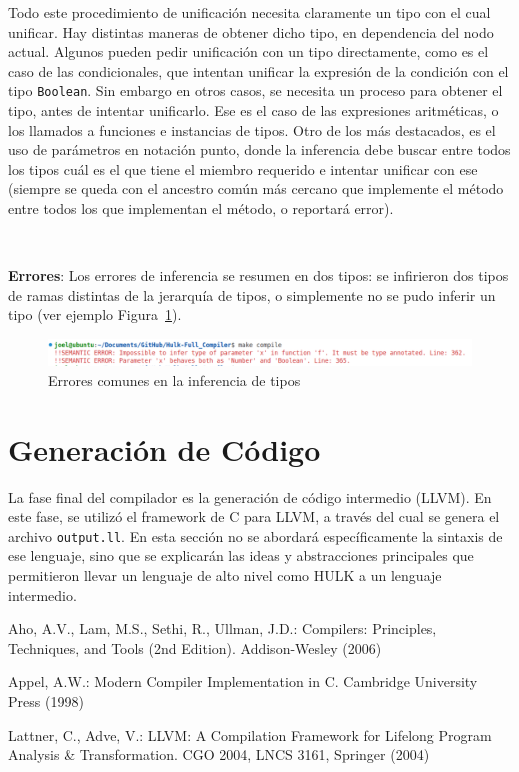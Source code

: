 \documentclass{llncs}
\begin{document}
Todo este procedimiento de unificación necesita claramente un tipo con el cual unificar. Hay distintas maneras de obtener dicho tipo, en dependencia del nodo actual. Algunos pueden pedir unificación con un tipo directamente, como es el caso de las condicionales, que intentan unificar la expresión de la condición con el tipo \texttt{Boolean}. 
Sin embargo en otros casos, se necesita un proceso para obtener el tipo, antes de intentar unificarlo. Ese es el caso de las expresiones aritméticas, o los llamados a funciones e instancias de tipos. Otro de los más destacados, es el uso de parámetros en notación punto, donde la inferencia debe buscar entre todos los tipos cuál es 
el que tiene el miembro requerido e intentar unificar con ese (siempre se queda con el ancestro común más cercano que implemente el método entre todos los que implementan el método, o reportará error).

\  

\textbf{Errores}: Los errores de inferencia se resumen en dos tipos: se infirieron dos tipos de ramas distintas de la jerarquía de tipos, o simplemente no se pudo inferir un tipo (ver ejemplo Figura~\ref{fig:errores_6}).
\begin{figure}[h]
\centering
\includegraphics[width=1\textwidth]{images/inference_errors.png}
\caption{Errores comunes en la inferencia de tipos}
\label{fig:errores_6}
\end{figure}

\vspace{10pt}
\section{Generación de Código}

La fase final del compilador es la generación de código intermedio (LLVM). En este fase, se utilizó el framework de C para LLVM, a través del cual se genera el archivo \texttt{output.ll}. En esta sección no se abordará específicamente la sintaxis de ese lenguaje, sino que se explicarán las ideas y abstracciones principales que permitieron llevar 
un lenguaje de alto nivel como HULK a un lenguaje intermedio. 
\vspace{10pt}
\begin{thebibliography}{9}
Aho, A.V., Lam, M.S., Sethi, R., Ullman, J.D.: 
Compilers: Principles, Techniques, and Tools (2nd Edition). 
Addison-Wesley (2006)

Appel, A.W.: Modern Compiler Implementation in C. 
Cambridge University Press (1998)

Lattner, C., Adve, V.: 
LLVM: A Compilation Framework for Lifelong Program Analysis \& Transformation. 
CGO 2004, LNCS 3161, Springer (2004)
\end{thebibliography}
\end{document}
